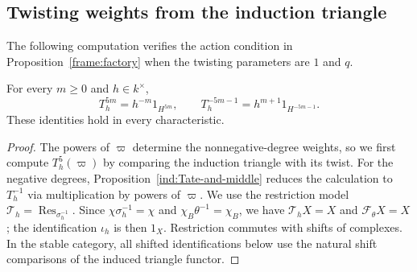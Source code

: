 \documentclass[11pt]{article}
\begin{document}
\subsection{Twisting weights from the induction triangle}

The following computation verifies the action condition in
Proposition~\ref{frame:factory} when the twisting parameters are
$1$ and $q$.

\begin{Prop}\label{ind:weights}
For every $m\ge0$ and $h\in k^\times$,
\begin{equation*}
 T_h^{5m}=h^{-m}1_{H^{5m}},\qquad
 T_h^{-5m-1}=h^{m+1}1_{H^{-5m-1}}.
\end{equation*}
These identities hold in every characteristic.
\end{Prop}
\begin{proof}
The powers of $\varpi$ determine the nonnegative-degree weights,
so we first compute $T_h^5(\varpi)$ by comparing the induction
triangle with its twist. For the negative degrees,
Proposition~\ref{ind:Tate-and-middle} reduces the calculation to
$T_h^{-1}$ via multiplication by powers of $\varpi$.
We use the restriction model
$\mathcal T_h=\operatorname{Res}_{\sigma_h^{-1}}$. Since
$\chi\sigma_h^{-1}=\chi$ and $\chi_B\theta^{-1}=\chi_B$, we have
$\mathcal T_hX=X$ and $\mathcal F_\theta X=X$; the identification
$\iota_h$ is then $1_X$. Restriction commutes with shifts of complexes.
In the stable category, all shifted identifications below use the
natural shift comparisons of the induced triangle functor.


\end{proof}
\end{document}
